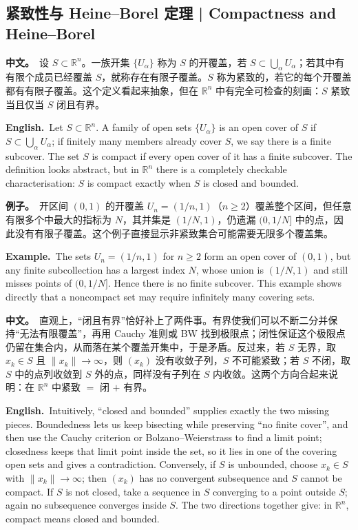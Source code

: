 \documentclass[UTF8,11pt,a4paper]{ctexart}
\newcommand{\BOTH}[2]{\par\noindent\textbf{中文。}\ #1\par\noindent\textbf{English.}\ #2\par}
\newcommand{\EX}[2]{\par\noindent\textbf{例子。}\ #1\par\noindent\textbf{Example.}\ #2\par}
\begin{document}
\subsection{紧致性与 Heine--Borel 定理 | Compactness and Heine--Borel}
\BOTH{设 $S\subset\mathbb R^n$。一族开集 $\{U_\alpha\}$ 称为 $S$ 的开覆盖，若 $S\subset\bigcup_\alpha U_\alpha$；若其中有有限个成员已经覆盖 $S$，就称存在有限子覆盖。$S$ 称为紧致的，若它的每个开覆盖都有有限子覆盖。这个定义看起来抽象，但在 $\mathbb R^n$ 中有完全可检查的刻画：$S$ 紧致当且仅当 $S$ 闭且有界。}{Let $S\subset\mathbb R^n$. A family of open sets $\{U_\alpha\}$ is an open cover of $S$ if $S\subset\bigcup_\alpha U_\alpha$; if finitely many members already cover $S$, we say there is a finite subcover. The set $S$ is compact if every open cover of it has a finite subcover. The definition looks abstract, but in $\mathbb R^n$ there is a completely checkable characterisation: $S$ is compact exactly when $S$ is closed and bounded.}
\EX{开区间 $(0,1)$ 的开覆盖 $U_n=(1/n,1)$（$n\ge2$）覆盖整个区间，但任意有限多个中最大的指标为 $N$，其并集是 $(1/N,1)$，仍遗漏 $(0,1/N]$ 中的点，因此没有有限子覆盖。这个例子直接显示非紧致集合可能需要无限多个覆盖集。}{The sets $U_n=(1/n,1)$ for $n\ge2$ form an open cover of $(0,1)$, but any finite subcollection has a largest index $N$, whose union is $(1/N,1)$ and still misses points of $(0,1/N]$. Hence there is no finite subcover. This example shows directly that a noncompact set may require infinitely many covering sets.}
\BOTH{直观上，“闭且有界”恰好补上了两件事。有界使我们可以不断二分并保持“无法有限覆盖”，再用 Cauchy 准则或 BW 找到极限点；闭性保证这个极限点仍留在集合内，从而落在某个覆盖开集中，于是矛盾。反过来，若 $S$ 无界，取 $x_k\in S$ 且 $\|x_k\|\to\infty$，则 $(x_k)$ 没有收敛子列，$S$ 不可能紧致；若 $S$ 不闭，取 $S$ 中的点列收敛到 $S$ 外的点，同样没有子列在 $S$ 内收敛。这两个方向合起来说明：在 $\mathbb R^n$ 中紧致 $=$ 闭 $+$ 有界。}{Intuitively, “closed and bounded” supplies exactly the two missing pieces. Boundedness lets us keep bisecting while preserving “no finite cover”, and then use the Cauchy criterion or Bolzano--Weierstrass to find a limit point; closedness keeps that limit point inside the set, so it lies in one of the covering open sets and gives a contradiction. Conversely, if $S$ is unbounded, choose $x_k\in S$ with $\|x_k\|\to\infty$; then $(x_k)$ has no convergent subsequence and $S$ cannot be compact. If $S$ is not closed, take a sequence in $S$ converging to a point outside $S$; again no subsequence converges inside $S$. The two directions together give: in $\mathbb R^n$, compact means closed and bounded.}
\end{document}
